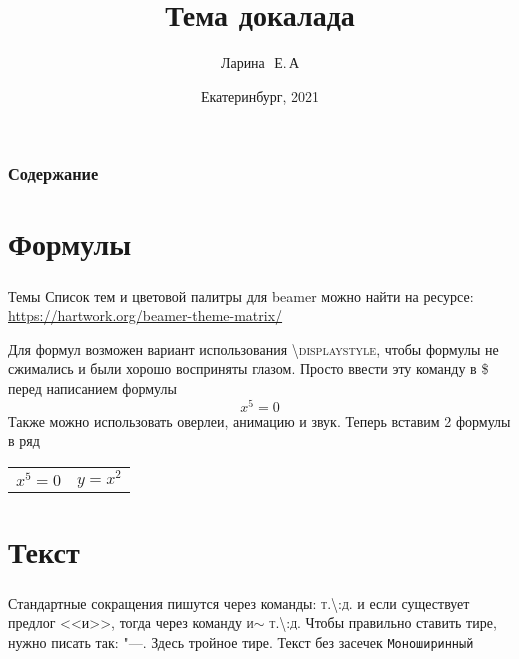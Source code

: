 \documentclass[russian]{beamer}
\title{Тема докалада}
\author{Ларина~\,Е.\,А}
\institute{Уральский Федеральный Университет}
\date{Екатеринбург, 2021}
\begin{document}
\begin{frame}
	\maketitle
	\setcounter{framenumber}{0}
\end{frame}

\begin{frame}
	\frametitle{Содержание}
	\tableofcontents
\end{frame}

\section{Формулы}
\begin{frame}
\frametitle{\insertsection}
\begin{block}{Темы}
Список тем и цветовой палитры для beamer можно найти на ресурсе:\newline
\href{https://hartwork.org/beamer-theme-matrix/}{https://hartwork.org/beamer-theme-matrix/}
\end{block}
Для формул возможен вариант использования \textsc{\textbackslash displaystyle}, чтобы формулы не сжимались и были хорошо восприняты глазом.\newline
Просто ввести эту команду в \textsc{\$} перед написанием формулы
$$
	x^5=0
$$
Также можно использовать оверлеи, анимацию и звук.\newline
Теперь вставим 2 формулы в ряд\newline
\begin{center}
\begin{tabular}{cc}
$x^5=0$ & $y=x^2$
\end{tabular}
\end{center}
\end{frame}

\section{Текст}
\begin{frame}
	\frametitle{\insertsection}
	Стандартные сокращения пишутся через команды: \textsc{т.\textbackslash:д.} и если существует предлог <<и>>, тогда через команду \textsc{и$\sim$ т.\textbackslash:д.}\newline
Чтобы правильно ставить тире, нужно писать так: \textsc{"---}. Здесь тройное тире.\newline
\textsf{Текст без засечек}\newline
\texttt{Моноширинный}\newline
{}\newline
{}
\end{frame}
\end{document}
